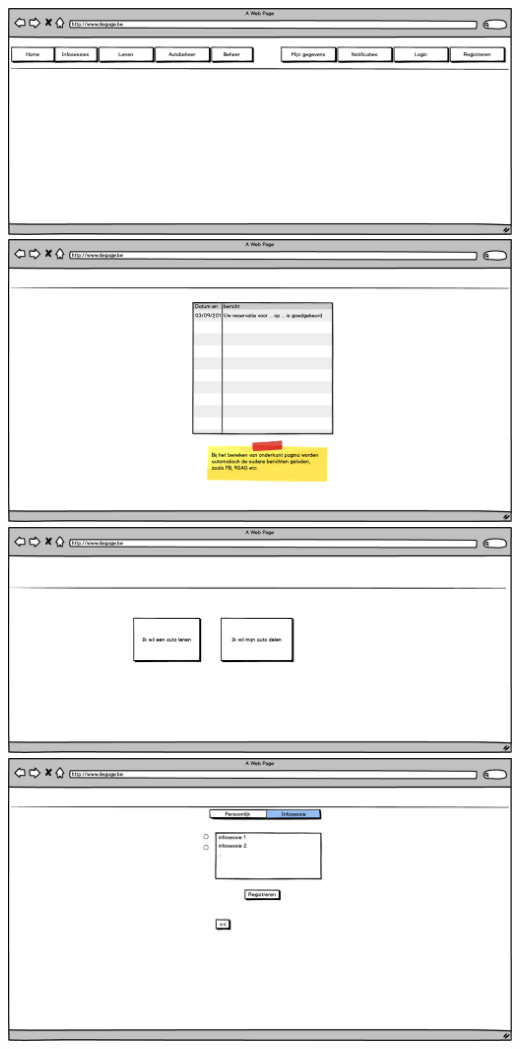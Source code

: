 \documentclass[]{article}
\begin{document}
\includegraphics[scale=0.4]{mockups/menu.png}
\includegraphics[scale=0.4]{mockups/notificaties.png}
\includegraphics[scale=0.4]{mockups/registratie.png}
\includegraphics[scale=0.4]{mockups/registratie_autolener_infosessie.png}
\end{document}
